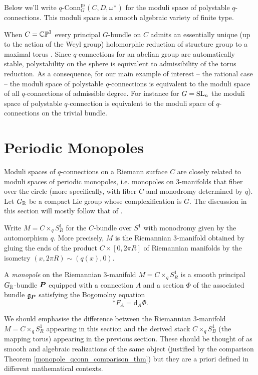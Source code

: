 \documentclass[10pt, oneside]{article}
\newcommand{\qconn}{q\text{-Conn}}
\renewcommand{\d}{\mathrm{d}}
\begin{document}
Below we'll write $\qconn_G^{\text{ps}}(C, D, \omega^\vee)$ for the moduli space of polystable $q$-connections.  This moduli space is a smooth algebraic variety of finite type.  

When $C = \mathbb{CP}^1$ every principal $G$-bundle on $C$ admits an essentially unique (up to the action of the Weyl group) holomorphic reduction of structure group to a maximal torus \cite{GrothendieckSphere}.  Since $q$-connections for an abelian group are automatically stable, polystability on the sphere is equivalent to admissibility of the torus reduction.  As a consequence, for our main example of interest -- the rational case -- the moduli space of polystable $q$-connections is equivalent to the moduli space of all $q$-connections of admissible degree.  For instance for $G=\mathrm{SL}_n$ the moduli space of polystable $q$-connection is equivalent to the moduli space of $q$-connections on the trivial bundle.

\section{Periodic Monopoles}
Moduli spaces of $q$-connections on a Riemann surface $C$ are closely related to moduli spaces of periodic monopoles, i.e. monopoles on 3-manifolds that fiber over the circle (more specifically, with fiber $C$ and monodromy determined by $q$).  Let $G_{\mathbb{R}}$ be a compact Lie group whose complexification is $G$.  The discussion in this section will mostly follow that of \cite{CharbonneauHurtubise, Smith}.

Write $M = C\times_q S^1_R$ for the $C$-bundle over $S^1$ with monodromy given by the automorphism $q$.  More precisely, $M$ is the Riemannian 3-manifold obtained by gluing the ends of the product $C \times [0,2\pi R]$ of Riemannian manifolds by the isometry $(x,2\pi R) \sim (q(x), 0)$.

\begin{definition}
A \emph{monopole} on the Riemannian 3-manifold $M = C \times_q S^1_R$ is a smooth principal $G_{\mathbb{R}}$-bundle $\boldsymbol{P}$ equipped with a connection $A$ and a section $\Phi$ of the associated bundle $\mathfrak{g}_{\boldsymbol{P}}$ satisfying the Bogomolny equation 
\[\ast F_A = \d_A \Phi.\]
\end{definition}

\begin{remark}
We should emphasise the difference between the Riemannian 3-manifold $M = C \times_q S^1_R$ appearing in this section and the derived stack $C \times_q S^1_B$ (the mapping torus) appearing in the previous section.  These should be thought of as smooth and algebraic realizations of the same object (justified by the comparison Theorem \ref{monopole_qconn_comparison_thm}) but they are a priori defined in different mathematical contexts.
\end{remark}
\end{document}
